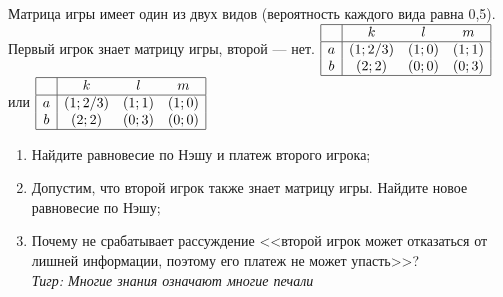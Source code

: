 \begin{problem}
Матрица игры имеет один из двух видов (вероятность каждого вида равна 0,5). Первый игрок знает матрицу игры, второй --- нет.
 $\begin{array}{|c|ccc|}  \hline {} & {k} & {l} & {m} \\  \hline {a} & {\left(1;{2\mathord{\left/ {\vphantom {2 3}} \right. \kern-\nulldelimiterspace} 3} \right)} & {\left(1;0\right)} & {\left(1;1\right)} \\ {b} & {\left(2;2\right)} & {\left(0;0\right)} & {\left(0;3\right)} \\  \hline  \end{array}$  или  $\begin{array}{|c|ccc|}  \hline {} & {k} & {l} & {m} \\  \hline {a} & {\left(1;{2\mathord{\left/ {\vphantom {2 3}} \right. \kern-\nulldelimiterspace} 3} \right)} & {\left(1;1\right)} & {\left(1;0\right)} \\ {b} & {\left(2;2\right)} & {\left(0;3\right)} & {\left(0;0\right)} \\  \hline  \end{array}$
 \begin{enumerate}
\item      Найдите равновесие по Нэшу и платеж второго игрока;\\
\item      Допустим, что второй игрок также знает матрицу игры. Найдите новое равновесие по Нэшу;\\
\item       Почему не срабатывает рассуждение <<второй игрок может отказаться от лишней информации,  поэтому его платеж не может упасть>>?\\
{\it Тигр: Многие знания означают многие печали}
\end{enumerate}


\begin{sol}

\end{sol}
\end{problem}






